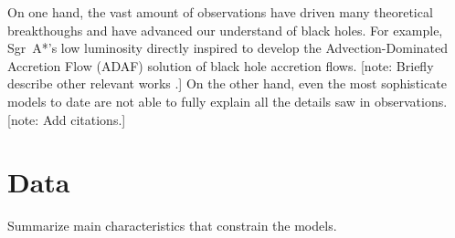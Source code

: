 \documentclass[twocolumn,tighten,dvipsnames]{aastex63}
\newcommand\sgra{Sgr~A*\xspace}
\newcommand\<{{\langle}}
\renewcommand\>{{\rangle}} %
\newcommand\note[1]{{\color{OliveGreen}[note: #1]}}
\begin{document}
On one hand, the vast amount of observations have driven many
theoretical breakthoughs and have advanced our understand of black
holes.
For example, \sgra's low luminosity directly inspired
\citet{1994ApJ...428L..13N, 1995ApJ...444..231N, 1995ApJ...452..710N,
  1996A&AS..120C.287N, 1998ApJ...492..554N} to develop the
Advection-Dominated Accretion Flow (ADAF) solution of black hole
accretion flows.
\note{Briefly describe other relevant works
  \citep{1999ApJ...522..870M, 2000ApJ...541..234O,
    2003ANS...324..445M, 2006MNRAS.370..219M, 2007MNRAS.379.1519M,
    2009A&A...508L..13M, 2009ApJ...698..676D, 2009ApJ...701..521C,
    2009ApJ...706..497M, 2012MNRAS.421.1315Z, 2013A&A...559L...3M,
    2014A&A...570A...7M, 2014ApJ...790....1B, 2015A&A...576A..41B,
    2015ApJ...799....1C, 2015ApJ...802...69B, 2015ApJ...812..103C,
    2015ApJ...814..115P, 2015Sci...350.1242J, 2016A&A...588A..57F,
    2016ApJ...817..173L, 2016ApJ...818..121P, 2016ApJ...824...40O,
    2016ApJ...826...77B, 2016ApJ...831....4P, 2016MNRAS.455.2187M,
    2016PhRvL.116c1101J, 2017ApJ...837..180G, 2017ApJ...844...35M,
    2017ApJ...851..148M, 2017MNRAS.467.3604R, 2018A&A...612A..34D,
    2018ApJ...856..163M, 2018ApJ...859...60L, 2018ApJ...863..148P,
    2018ApJ...865..104J, 2018ApJ...868..101B, 2018JCAP...07..015H,
    2018MNRAS.478.1875J, 2018MNRAS.478.5209C, 2019ApJ...871...30I,
    2019ApJ...881L...2B, 2019ApJ...884..148B, 2019ApJ...886...96H,
    2019GReGr..51..137P, 2020ApJ...896L...6R, 2020ApJ...897...99T,
    2020MNRAS.492.3272R, 2020MNRAS.493.1404A, 2020MNRAS.494.4168D,
    2020MNRAS.494.5923P, 2020arXiv200514251B, 2020arXiv200603657D,
    2020arXiv200603658P}.}
On the other hand, even the most sophisticate models to date are not
able to fully explain all the details saw in observations.
\note{Add citations.}

\section{Data}


Summarize main characteristics that constrain the models.
\end{document}
